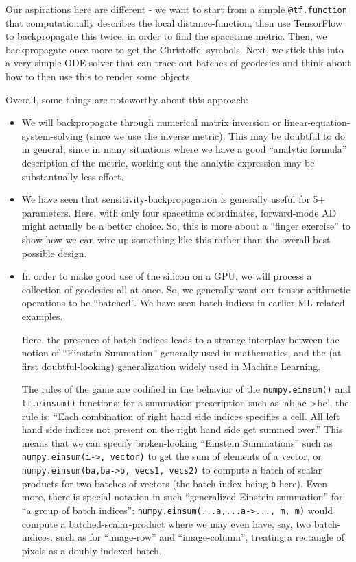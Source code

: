 \documentclass[11pt]{article}
\begin{document}
Our aspirations here are different - we want to start from a simple
\texttt{@tf.function} that computationally describes the local
distance-function, then use TensorFlow to backpropagate this twice, in
order to find the spacetime metric. Then, we backpropagate once more to
get the Christoffel symbols. Next, we stick this into a very simple
ODE-solver that can trace out batches of geodesics and think about how
to then use this to render some objects.

Overall, some things are noteworthy about this approach:

\begin{itemize}
\item
  We will backpropagate through numerical matrix inversion or
  linear-equation-system-solving (since we use the inverse metric). This
  may be doubtful to do in general, since in many situations where we
  have a good ``analytic formula'' description of the metric, working
  out the analytic expression may be substantually less effort.
\item
  We have seen that sensitivity-backpropagation is generally useful for
  5+ parameters. Here, with only four spacetime coordinates,
  forward-mode AD might actually be a better choice. So, this is more
  about a ``finger exercise'' to show how we can wire up something like
  this rather than the overall best possible design.
\item
  In order to make good use of the silicon on a GPU, we will process a
  collection of geodesics all at once. So, we generally want our
  tensor-arithmetic operations to be ``batched''. We have seen
  batch-indices in earlier ML related examples.

  Here, the presence of batch-indices leads to a strange interplay
  between the notion of ``Einstein Summation'' generally used in
  mathematics, and the (at first doubtful-looking) generalization widely
  used in Machine Learning.

  The rules of the game are codified in the behavior of the
  \texttt{numpy.einsum()} and \texttt{tf.einsum()} functions: for a
  summation prescription such as `ab,ac-\textgreater bc', the rule is:
  ``Each combination of right hand side indices specifies a cell. All
  left hand side indices not present on the right hand side get summed
  over.'' This means that we can specify broken-looking ``Einstein
  Summations'' such as
  \texttt{numpy.einsum(\textquotesingle{}i-\textgreater{}\textquotesingle{},\ vector)}
  to get the sum of elements of a vector, or
  \texttt{numpy.einsum(\textquotesingle{}ba,ba-\textgreater{}b\textquotesingle{},\ vecs1,\ vecs2)}
  to compute a batch of scalar products for two batches of vectors (the
  batch-index being \texttt{b} here). Even more, there is special
  notation in such ``generalized Einstein summation'' for ``a group of
  batch indices'':
  \texttt{numpy.einsum(\textquotesingle{}...a,...a-\textgreater{}...\textquotesingle{},\ m,\ m)}
  would compute a batched-scalar-product where we may even have, say,
  two batch-indices, such as for ``image-row'' and ``image-column'',
  treating a rectangle of pixels as a doubly-indexed batch.
\end{itemize}
\end{document}
